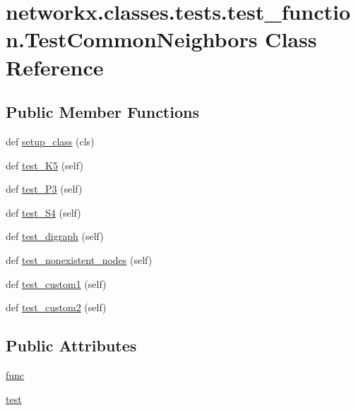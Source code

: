\hypertarget{classnetworkx_1_1classes_1_1tests_1_1test__function_1_1TestCommonNeighbors}{}\section{networkx.\+classes.\+tests.\+test\+\_\+function.\+Test\+Common\+Neighbors Class Reference}
\label{classnetworkx_1_1classes_1_1tests_1_1test__function_1_1TestCommonNeighbors}
\subsection*{Public Member Functions}
\begin{DoxyCompactItemize}
\item 
def \hyperlink{classnetworkx_1_1classes_1_1tests_1_1test__function_1_1TestCommonNeighbors_a8a20ca9c3ab68e8702d19d8e452cdcd3}{setup\+\_\+class} (cls)
\item 
def \hyperlink{classnetworkx_1_1classes_1_1tests_1_1test__function_1_1TestCommonNeighbors_a98b75374e64b4d50b28a50091cd016b4}{test\+\_\+\+K5} (self)
\item 
def \hyperlink{classnetworkx_1_1classes_1_1tests_1_1test__function_1_1TestCommonNeighbors_a551fee513d401775fe8abd769bfc7345}{test\+\_\+\+P3} (self)
\item 
def \hyperlink{classnetworkx_1_1classes_1_1tests_1_1test__function_1_1TestCommonNeighbors_a40aa16da050d7e9724b274e5ba87b0f1}{test\+\_\+\+S4} (self)
\item 
def \hyperlink{classnetworkx_1_1classes_1_1tests_1_1test__function_1_1TestCommonNeighbors_a650c0fcb66d55042ff352a5a2d02d256}{test\+\_\+digraph} (self)
\item 
def \hyperlink{classnetworkx_1_1classes_1_1tests_1_1test__function_1_1TestCommonNeighbors_a9804cb8738b29a906082ad77f2b54de8}{test\+\_\+nonexistent\+\_\+nodes} (self)
\item 
def \hyperlink{classnetworkx_1_1classes_1_1tests_1_1test__function_1_1TestCommonNeighbors_a6c4ca9e85385a1f1aa6112a8dd888b77}{test\+\_\+custom1} (self)
\item 
def \hyperlink{classnetworkx_1_1classes_1_1tests_1_1test__function_1_1TestCommonNeighbors_a694cc491c620cce238305841edd115d8}{test\+\_\+custom2} (self)
\end{DoxyCompactItemize}
\subsection*{Public Attributes}
\begin{DoxyCompactItemize}
\item 
\hyperlink{classnetworkx_1_1classes_1_1tests_1_1test__function_1_1TestCommonNeighbors_a5089eee3052e881a6aa42cf07b1c8a9f}{func}
\item 
\hyperlink{classnetworkx_1_1classes_1_1tests_1_1test__function_1_1TestCommonNeighbors_a64be16d951883abf3f6c2c75bcba752e}{test}
\end{DoxyCompactItemize}


